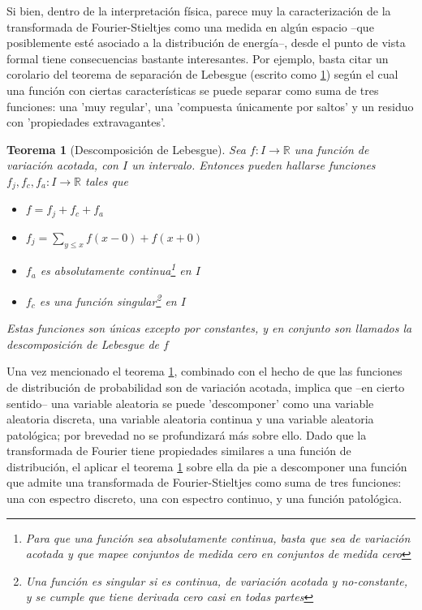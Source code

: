 \documentclass[12pt,a4paper]{mitthesis}
\newtheorem{thrm}{Teorema}
\newcommand{\R}{\mathbb{R}}
\begin{document}
Si bien, dentro de la interpretaci\'on f\'isica, parece muy la caracterizaci\'on de la transformada 
de Fourier-Stieltjes como una medida en alg\'un espacio --que posiblemente est\'e asociado a la 
distribuci\'on de energ\'ia--, desde el punto de vista formal tiene consecuencias bastante 
interesantes.
Por ejemplo, basta citar un corolario del teorema de separaci\'on de Lebesgue (escrito como 
\ref{Lebesgue_decomp}) seg\'un el cual una funci\'on con ciertas caracter\'isticas se puede separar 
como suma de tres funciones: una 'muy regular', una 'compuesta \'unicamente por saltos' y 
un residuo con 'propiedades extravagantes'.

\begin{thrm}[Descomposici\'on de Lebesgue]
Sea $f:I\rightarrow \R$ una funci\'on de variaci\'on acotada, con $I$ un intervalo. Entonces pueden 
hallarse funciones $f_j, f_c, f_a :I\rightarrow \R$ tales que
\begin{itemize}
\item $f = f_j+ f_c+ f_a$
\item $f_j = \sum_{y \leq x} f(x-0) + f(x+0)$
\item $f_a$ es absolutamente continua\footnote{Para que una funci\'on sea absolutamente continua,
basta que sea de variaci\'on acotada y que mapee conjuntos de medida cero en conjuntos de medida
cero} en $I$
\item $f_c$ es una funci\'on singular\footnote{Una funci\'on es singular si es continua, de 
variaci\'on acotada y no-constante, y se cumple que tiene derivada cero casi en todas partes} en 
$I$
\end{itemize}
Estas funciones son \'unicas excepto por constantes, y en conjunto son llamados la 
\textit{descomposici\'on de Lebesgue} de $f$
\label{Lebesgue_decomp}
\end{thrm}

Una vez mencionado el teorema \ref{Lebesgue_decomp}, combinado con el hecho de que las funciones de 
distribuci\'on de probabilidad son de variaci\'on acotada, implica que --en cierto sentido-- una 
variable aleatoria se puede 'descomponer' como una variable aleatoria discreta, una variable 
aleatoria continua y una variable aleatoria patol\'ogica; por brevedad no se profundizar\'a m\'as 
sobre ello.
Dado que la transformada de Fourier tiene propiedades similares a una funci\'on de distribuci\'on,
el aplicar el teorema \ref{Lebesgue_decomp} sobre ella da pie a descomponer una funci\'on que 
admite una transformada de Fourier-Stieltjes como suma de tres funciones: una con espectro 
discreto, una con espectro continuo, y una funci\'on patol\'ogica.
\end{document}
